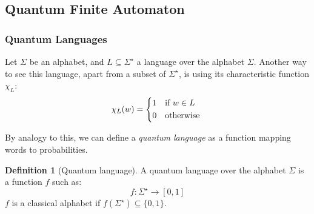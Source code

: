 \documentclass[12pt,a4paper]{article}
\theoremstyle{plain}
\theoremstyle{definition}
\newtheorem*{definition}{Definition}
\begin{document}
\subsection{Quantum Finite Automaton}
\subsubsection{Quantum Languages}
Let $\Sigma$ be an alphabet, and $L\subseteq \Sigma^\star$ a language over the alphabet $\Sigma$. Another way to see this language, apart from a subset of $\Sigma^\star$, is using its characteristic function $\chi_L$:
\begin{equation*}
    \chi_L(w) = \begin{cases*}
        1 & if $w\in L$\\
        0 & otherwise
    \end{cases*}
\end{equation*}

By analogy to this, we can define a \emph{quantum language} as a function mapping words to probabilities.\cite{quantum-automata-grammars}
\begin{definition}[Quantum language]
    A quantum language over the alphabet $\Sigma$ is a function $f$ such as:
    \begin{equation*}
        f : \Sigma^\star \to [0, 1]
    \end{equation*}
    $f$ is a classical alphabet if $f(\Sigma^\star) \subseteq \{0, 1\}$.
\end{definition}
\end{document}
